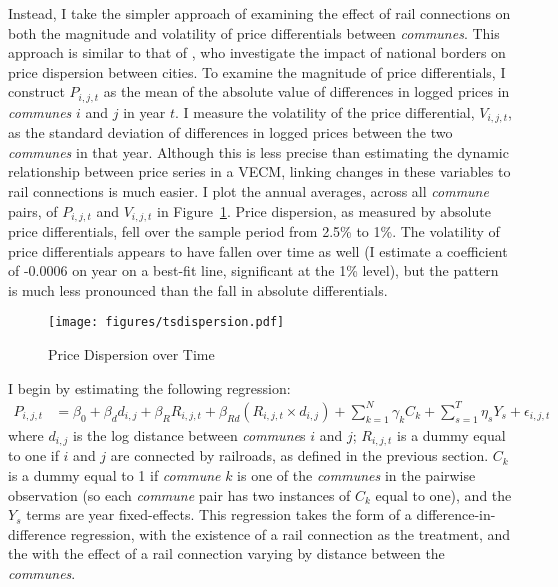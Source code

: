 \documentclass[12pt,twoside]{article}
\begin{document}
Instead, I take the simpler approach of examining the effect of rail connections on both the magnitude and volatility of price differentials between \emph{communes}.
This approach is similar to that of \cite{engelrogers}, who investigate the impact of national borders on price dispersion between cities.
To examine the magnitude of price differentials, I construct $P_{i,j,t}$ as the mean of the absolute value of differences in logged prices in \emph{communes} $i$ and $j$ in year $t$.
I measure the volatility of the price differential, $V_{i,j,t}$, as the standard deviation of differences in logged prices between the two \emph{communes} in that year.
Although this is less precise than estimating the dynamic relationship between price series in a VECM, linking changes in these variables to rail connections is much easier.
I plot the annual averages, across all \emph{commune} pairs, of $P_{i,j,t}$ and $V_{i,j,t}$ in Figure~\ref{fig:tsdifferentials}.
Price dispersion, as measured by absolute price differentials, fell over the sample period from 2.5\% to 1\%.
The volatility of price differentials appears to have fallen over time as well (I estimate a coefficient of -0.0006 on year on a best-fit line, significant at the 1\% level), but the pattern is much less pronounced than the fall in absolute differentials.

\begin{figure}[ht]
	\centering \caption{Price Dispersion over Time}
	\texttt{[image: figures/tsdispersion.pdf]}
	\label{fig:tsdifferentials}
\end{figure}

I begin by estimating the following regression:
\begin{align}
	P_{i,j,t} &= \beta_0 + \beta_d d_{i,j} + \beta_R R_{i,j,t} + \beta_{Rd} (R_{i,j,t} \times d_{i,j}) + \sum_{k=1}^{N} \gamma_k C_k + \sum_{s=1}^{T} \eta_s Y_s + \epsilon_{i,j,t} \label{eq:reg1}
\end{align}
where $d_{i,j}$ is the log distance between \emph{commune}s $i$ and $j$; $R_{i,j,t}$ is a dummy equal to one if $i$ and $j$ are connected by railroads, as defined in the previous section.
$C_k$ is a dummy equal to 1 if \emph{commune} $k$ is one of the \emph{communes} in the pairwise observation (so each \emph{commune} pair has two instances of $C_k$ equal to one), and the $Y_s$ terms are year fixed-effects.
This regression takes the form of a difference-in-difference regression, with the existence of a rail connection as the treatment, and the with the effect of a rail connection varying by distance between the \emph{communes}.
\end{document}

